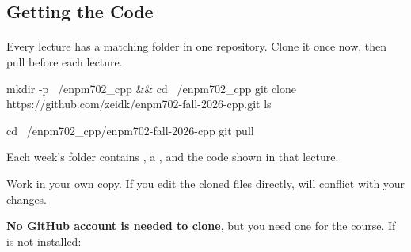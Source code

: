 \documentclass[
    10pt,
    dvipsnames,
    svgnames,
    x11names,
    aspectratio=1610,
    english,
    codeminted]{beamer}
\begin{document}
\subsection*{Getting the Code}
\begingroup
\divframetrue
\renewcommand{\divbartextA}{\secname}
\renewcommand{\divbartextB}{}
\begin{frame}{\secname}
  \divbar{\secname}{\subsecname}
  \framesubtitle{\subsecname}

Every lecture has a matching folder in one repository. Clone it once now, then pull before each lecture.

\begin{bashcodebasic}[][fontsize=\footnotesize]
mkdir -p ~/enpm702_cpp && cd ~/enpm702_cpp
git clone https://github.com/zeidk/enpm702-fall-2026-cpp.git
ls
\end{bashcodebasic}

\begin{bashcodebasic}[][fontsize=\footnotesize]
cd ~/enpm702_cpp/enpm702-fall-2026-cpp
git pull
\end{bashcodebasic}

\begin{compactitem}
\small
    \item Each week's folder contains , a , and the code shown in that lecture.
    \item Work in your own copy. If you edit the cloned files directly,  will conflict with your changes.
\end{compactitem}

\medskip
\begin{MyBox}
\textbf{No GitHub account is needed to clone}, but you need one for the course. If  is not installed: 
\end{MyBox}
\end{frame}
\endgroup
\end{document}
